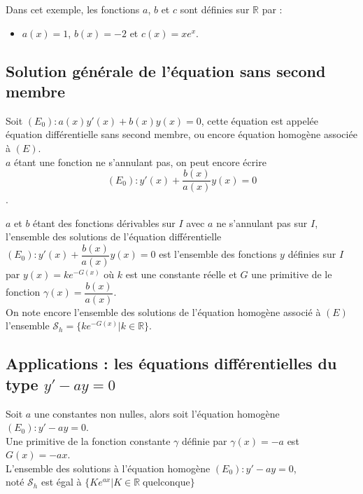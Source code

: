 \documentclass[french]{book}
\newcommand{\R}{\mathbb {R}}
\newcommand{\cals}{\mathscr{S}}
\begin{document}
\begin{exemple}
Dans cet exemple, les fonctions $a$, $b$ et $c$ sont définies sur $\R$ par :
\begin{itemize}
   \item $a(x)=1$, $b(x)=-2$ et $c(x)=xe^x$.
\end{itemize}
\end{exemple}


\newpage

\subsection{Solution générale de l'équation sans second membre}

Soit $(E_0):a(x)y'(x)+b(x)y(x)=0$, cette équation est appelée équation différentielle sans second membre, ou encore équation homogène associée à $(E)$. \\
$a$ étant une fonction ne s'annulant pas, on peut encore écrire 
$$(E_0):y'(x)+\dfrac{b(x)}{a(x)}y(x)=0$$.

\begin{thm}
   $a$ et $b$ étant des fonctions dérivables sur $I$ avec $a$ ne s'annulant pas sur $I$, l'ensemble des solutions de l'équation différentielle $(E_0):y'(x)+\dfrac{b(x)}{a(x)}y(x)=0$ est l'ensemble des fonctions $y$ définies sur $I$ par $y(x)=ke^{-G(x)}$ où $k$ est une constante réelle et $G$ une primitive de le fonction $\gamma(x)=\dfrac{b(x)}{a(x)}$. \\ 
   
 On note encore  l'ensemble des solutions de l'équation homogène associé à $(E)$ l'ensemble $\cals_h=\{  ke^{-G(x)} \vert k\in \mathbb{R} \}$.
  
\end{thm}
\subsection{Applications : les équations différentielles du type $y'-ay=0$ }

Soit $a$ une constantes non nulles, alors soit l'équation homogène $(E_0): y'-ay=0 $. \\

Une primitive de la fonction constante $\gamma$ définie par $\gamma(x)=-a$ est $G(x)=-ax$. \\

L'ensemble des solutions à l'équation homogène $(E_0): y'-ay=0 $,\\
 noté $\cals_h$ est égal à $\{Ke^{ax} \vert  K\in \mathbb{R} \; \text{quelconque} \}$
\end{document}
